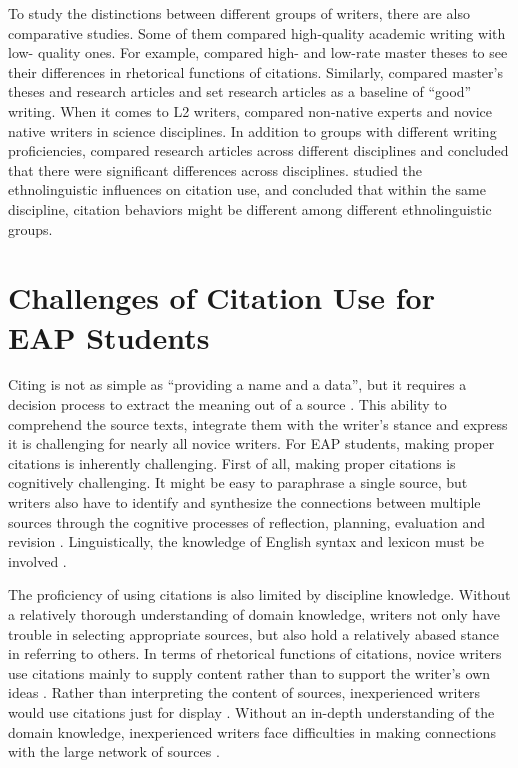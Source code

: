 To study the distinctions between different groups of writers, there are also comparative studies. Some of them compared high-quality academic writing with low- quality ones. For example, \citet{petric_rhetorical_2007} compared high- and low-rate master theses to see their differences in rhetorical functions of citations. Similarly, \citet{samraj_form_2013} compared master’s theses and research articles and set research articles as a baseline of “good” writing. When it comes to L2 writers, \citet{mansourizadeh_citation_2011} compared non-native experts and novice native writers in science disciplines. In addition to groups with different writing proficiencies, \citet{hyland_academic_1999} compared research articles across different disciplines and concluded that there were significant differences across disciplines. \citet{hu_disciplinary_2014} studied the ethnolinguistic influences on citation use, and concluded that within the same discipline, citation behaviors might be different among different ethnolinguistic groups.

\section{Challenges of Citation Use for EAP Students}
Citing is not as simple as “providing a name and a data”, but it requires a decision process to extract the meaning out of a source \citep[p.~21]{shi_textual_2010}. This ability to comprehend the source texts, integrate them with the writer’s stance and express it is challenging for nearly all novice writers. For EAP students, making proper citations is inherently challenging. First of all, making proper citations is cognitively challenging. It might be easy to paraphrase a single source, but writers also have to identify and synthesize the connections between multiple sources through the cognitive processes of reflection, planning, evaluation and revision \citep{bereiter_psychology_2013,hyland_drawing_2009,kirkland_maximizing_1991,segev-miller_cognitive_2007}. Linguistically, the knowledge of English syntax and lexicon must be involved \citep{mayes_quotation_1990}.

The proficiency of using citations is also limited by discipline knowledge. Without a relatively thorough understanding of domain knowledge, writers not only have trouble in selecting appropriate sources, but also hold a relatively abased stance in referring to others. In terms of rhetorical functions of citations, novice writers use citations mainly to supply content rather than to support the writer’s own ideas \citep{mansourizadeh_citation_2011,petric_rhetorical_2007}. Rather than interpreting the content of sources, inexperienced writers would use citations just for display \citep{bereiter_psychology_2013}. Without an in-depth understanding of the domain knowledge, inexperienced writers face difficulties in making connections with the large network of sources \citep{hyland_representing_2005}.

